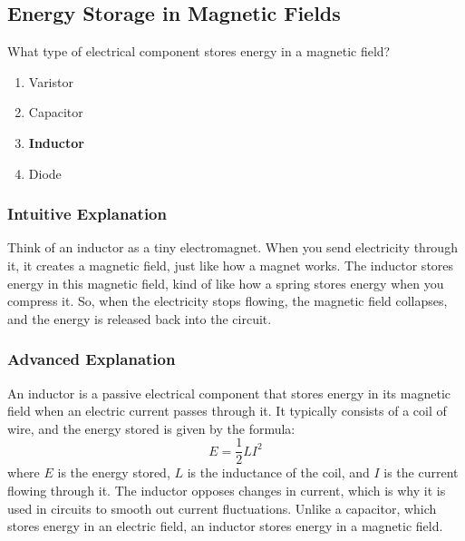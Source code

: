 \subsection{Energy Storage in Magnetic Fields}
\label{T6A06}

\begin{tcolorbox}[colback=gray!10!white,colframe=black!75!black,title=T6A06]
What type of electrical component stores energy in a magnetic field?
\begin{enumerate}[noitemsep]
    \item Varistor
    \item Capacitor
    \item \textbf{Inductor}
    \item Diode
\end{enumerate}
\end{tcolorbox}

\subsubsection*{Intuitive Explanation}
Think of an inductor as a tiny electromagnet. When you send electricity through it, it creates a magnetic field, just like how a magnet works. The inductor stores energy in this magnetic field, kind of like how a spring stores energy when you compress it. So, when the electricity stops flowing, the magnetic field collapses, and the energy is released back into the circuit.

\subsubsection*{Advanced Explanation}
An inductor is a passive electrical component that stores energy in its magnetic field when an electric current passes through it. It typically consists of a coil of wire, and the energy stored is given by the formula:
\[
E = \frac{1}{2} L I^2
\]
where \( E \) is the energy stored, \( L \) is the inductance of the coil, and \( I \) is the current flowing through it. The inductor opposes changes in current, which is why it is used in circuits to smooth out current fluctuations. Unlike a capacitor, which stores energy in an electric field, an inductor stores energy in a magnetic field.